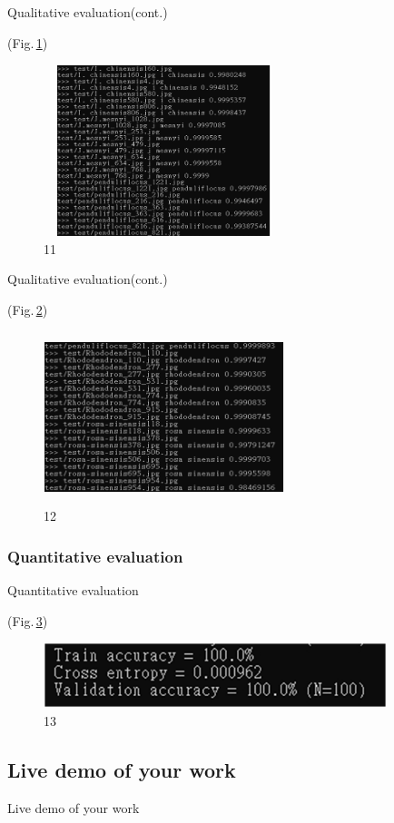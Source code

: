 \documentclass{beamer}
\begin{document}
\begin{frame}{Qualitative evaluation(cont.)}
\begin{CJK}{UTF8}{bkai}
(Fig.\,\ref{fig:11})
 \end{CJK}
 \begin{figure}
    \includegraphics[width=7cm,height=5cm]{Qualitative(3).png}
    \caption{11}
    \label{fig:11}
  \end{figure}
\end{frame}


\begin{frame}{Qualitative evaluation(cont.)}
\begin{CJK}{UTF8}{bkai}
(Fig.\,\ref{fig:12})
 \end{CJK}
 \begin{figure}
    \includegraphics[width=7cm,height=5cm]{Qualitative(4).png}
    \caption{12}
    \label{fig:12}
  \end{figure}
\end{frame}

\subsubsection{Quantitative evaluation}
\begin{frame}{Quantitative evaluation}

\begin{CJK}{UTF8}{bkai}
(Fig.\,\ref{fig:13})
 \end{CJK}
 \begin{figure}
    \includegraphics[width=10cm]{Qauntitative.png}
    \caption{13}
    \label{fig:13}
  \end{figure}


\end{frame}

\subsection{Live demo of your work}
\begin{frame}{Live demo of your work}

\end{frame}
\end{document}
